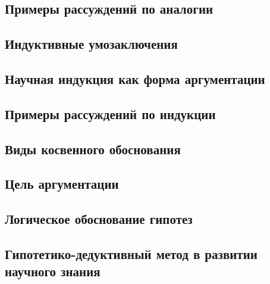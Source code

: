 \documentclass[main.tex]{subfiles}
\begin{document}
\subsection{Примеры рассуждений по аналогии}


\subsection{Индуктивные умозаключения}


\subsection{Научная индукция как форма аргументации}



\subsection{Примеры рассуждений по индукции}



\subsection{Виды косвенного обоснования}


\subsection{Цель аргументации}


\subsection{Логическое обоснование гипотез}


\subsection{Гипотетико-дедуктивный метод в развитии научного знания}

\end{document}
